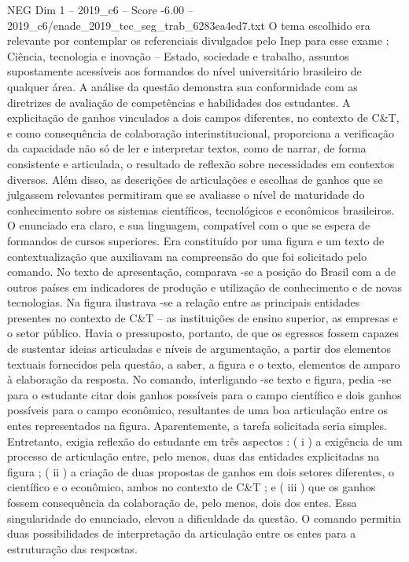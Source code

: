 \begin{textsample}{NEG Dim 1 – 2019\_c6 – Score -6.00 – 2019\_c6/enade\_2019\_tec\_seg\_trab\_6283ea4ed7.txt}
O tema escolhido era relevante por contemplar os referenciais divulgados pelo Inep para esse exame : Ciência, tecnologia e inovação – Estado, sociedade e trabalho, assuntos supostamente acessíveis aos formandos do nível universitário brasileiro de qualquer área.
A análise da questão demonstra sua conformidade com as diretrizes de avaliação de competências e habilidades dos estudantes.
A explicitação de ganhos vinculados a dois campos diferentes, no contexto de C\&T, e como consequência de colaboração interinstitucional, proporciona a verificação da capacidade não só de ler e interpretar textos, como de narrar, de forma consistente e articulada, o resultado de reflexão sobre necessidades em contextos diversos.
Além disso, as descrições de articulações e escolhas de ganhos que se julgassem relevantes permitiram que se avaliasse o nível de maturidade do conhecimento sobre os sistemas científicos, tecnológicos e econômicos brasileiros.
O enunciado era claro, e sua linguagem, compatível com o que se espera de formandos de cursos superiores.
Era constituído por uma figura e um texto de contextualização que auxiliavam na compreensão do que foi solicitado pelo comando.
No texto de apresentação, comparava -se a posição do Brasil com a de outros países em indicadores de produção e utilização de conhecimento e de novas tecnologias.
Na figura ilustrava -se a relação entre as principais entidades presentes no contexto de C\&T – as instituições de ensino superior, as empresas e o setor público.
Havia o pressuposto, portanto, de que os egressos fossem capazes de sustentar ideias articuladas e níveis de argumentação, a partir dos elementos textuais fornecidos pela questão, a saber, a figura e o texto, elementos de amparo à elaboração da resposta.
No comando, interligando -se texto e figura, pedia -se para o estudante citar dois ganhos possíveis para o campo científico e dois ganhos possíveis para o campo econômico, resultantes de uma boa articulação entre os entes representados na figura.
Aparentemente, a tarefa solicitada seria simples.
Entretanto, exigia reflexão do estudante em três aspectos : ( i ) a exigência de um processo de articulação entre, pelo menos, duas das entidades explicitadas na figura ; ( ii ) a criação de duas propostas de ganhos em dois setores diferentes, o científico e o econômico, ambos no contexto de C\&T ; e ( iii ) que os ganhos fossem consequência da colaboração de, pelo menos, dois dos entes.
Essa singularidade do enunciado, elevou a dificuldade da questão.
O comando permitia duas possibilidades de interpretação da articulação entre os entes para a estruturação das respostas.

\end{textsample}
